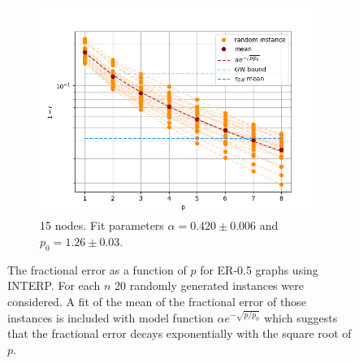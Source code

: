 \begin{figure}[H]
\begin{subfigure}[t]{0.45\textwidth}
		\includegraphics[width=\textwidth]{figures/interp/fom_er050_n15}
		\caption{15 nodes. Fit parameters $\alpha = 0.420 \pm 0.006$ and $p_0 = 1.26 \pm 0.03$.}
	\end{subfigure}
	\caption{The fractional error as a function of $p$ for ER-0.5 graphs using INTERP. For each $n$ 20 randomly generated instances were considered. A fit of the mean of the fractional error of those instances is included with model function $\alpha e^{-\sqrt{p/p_0}}$ which suggests that the fractional error decays exponentially with the square root of $p$. }
\end{figure}

